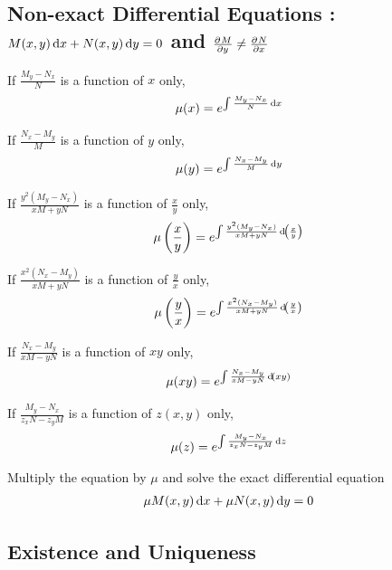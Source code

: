\documentclass[fleqn, a4paper, 8pt, twoside]{amsart}
\theoremstyle{definition}
\theoremstyle{theorem}
\begin{document}
\begin{multicols}{2}
\begin{spacing}{0.85}
\subsection{Non-exact Differential Equations : $M(x,y) \dif x + N(x,y) \dif y = 0$ and $\pd{M}{y} \neq \pd{N}{x}$}

\begin{algorithmic}[1]
	\item
		If $\frac{M_y - N_x}{N}$ is a function of $x$ only,
		\begin{align*}
			\mu(x) &= e^{\int \frac{M_y - N_x}{N} \dif x}
		\end{align*}
	\item
		If $\frac{N_x - M_y}{M}$ is a function of $y$ only,
		\begin{align*}
			\mu(y) &= e^{\int \frac{N_x - M_y}{M} \dif y}
		\end{align*}
	\item
		If $\frac{y^2 (M_y - N_x)}{x M + y N}$ is a function of $\frac{x}{y}$ only,
		\begin{align*}
			\mu\left( \frac{x}{y} \right) &= e^{\int \frac{y^2 (M_y - N_x)}{x M + y N} \dif\left( \frac{x}{y} \right)}
		\end{align*}
	\item
		If $\frac{x^2 (N_x - M_y)}{x M + y N}$ is a function of $\frac{y}{x}$ only,
		\begin{align*}
			\mu\left( \frac{y}{x} \right) &= e^{\int \frac{x^2 (N_x - M_y)}{x M + y N} \dif\left( \frac{y}{x} \right)}
		\end{align*}
	\item
		If $\frac{N_x - M_y}{x M - y N}$ is a function of $x y$ only,
		\begin{align*}
			\mu(x y) &= e^{\int \frac{N_x - M_y}{x M - y N} \dif (x y)}
		\end{align*}
	\item
		If $\frac{M_y - N_x}{z_x N - z_y M}$ is a function of $z(x,y)$ only,
		\begin{align*}
			\mu(z) &= e^{\int \frac{M_y - N_x}{z_x N - z_y M} \dif z}
		\end{align*}
	\item
		Multiply the equation by $\mu$ and solve the exact differential equation
		\begin{align*}
			\mu M(x,y) \dif x + \mu N(x,y) \dif y &= 0
		\end{align*}
\end{algorithmic}

\subsection{Existence and Uniqueness}


\end{spacing}
\end{multicols}
\end{document}

